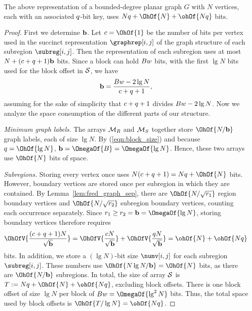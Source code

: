 {%
\begin{lemma}
  \label{lem:main_space}
  The above representation of a bounded-degree planar graph $G$ with
  $N$ vertices, each with an associated $q$-bit key, uses 
  $N \bitsPerKey + \OhOf{N} + \ohOf{N \bitsPerKey}$ bits.
\end{lemma}

\begin{proof}
  First we determine $\textbf{b}$.
  Let $c = \OhOf{1}$ be the number of bits per vertex used in the succinct
  representation $\graphrep[i,j]$ of the graph structure of each subregion
  $\subreg[i,j]$.
  Then the representation of each subregion uses at most 
  $N + (c + q + 1)\textbf{b}$ bits.
  Since a block can hold $B w$ bits, with the first $\lg N$ bits used
  for the block offset in $\mathcal{S}$, we have
  \begin{equation}
    \label{eqn:block_size}
    \textbf{b} = \frac{B w - 2 \lg N}{c + q + 1},
  \end{equation}
  assuming for the sake of simplicity that $c + q + 1$ divides 
  $B w - 2 \lg N$.
  Now we analyze the space consumption of the different parts of our structure.

  \textit{Minimum graph labels.}  The arrays $\mathcal{M}_R$ and $\mathcal{M}_S$
  together store $\OhOf{N / \succblksize}$ graph labels, each of size $\lg N$.
  By (\ref{eqn:block_size}) and because $\bitsPerKey = \OhOf{\lg N}$, 
  $\succblksize = \OmegaOf{B} = \OmegaOf{\lg N}$.
  Hence, these two arrays use $\OhOf{N}$ bits of space.

  \textit{Subregions.}  Storing every vertex once uses $N (c + \bitsPerKey + 1)
  = N \bitsPerKey + \OhOf{N}$ bits.
  However, boundary vertices are stored once per subregion in which they are 
  contained.
  By Lemma~\ref{lem:fred_graph_sep}, there are $\OhOf{N / \sqrt{\regsz}}$ region
  boundary vertices and $\OhOf{N / \sqrt{\subregsz}}$ subregion boundary
  vertices, counting each occurrence separately.
  Since $\regsz \ge \subregsz = \succblksize = \OmegaOf{\lg N}$, storing boundary
  vertices therefore requires
  \begin{equation*}
    \OhOfV{\frac{(c + \bitsPerKey + 1)N}{\sqrt{\succblksize}}} =
    \OhOfV{\frac{cN}{\sqrt{\succblksize}}} +
    \OhOfV{\frac{\bitsPerKey N}{\sqrt{\succblksize}}} = \ohOf{N} + \ohOf{N \bitsPerKey}
  \end{equation*}
  bits.
  In addition, we store a $(\lg N)$-bit size $\numv[i,j]$ for each
  subregion $\subreg[i,j]$.
  These numbers use $\OhOf{N \lg N / \succblksize} = \OhOf{N}$
  bits, as there are $\OhOf{N / \succblksize}$ subregions.
  In total, the size of array $\mathcal{S}$ is $T := N \bitsPerKey + \OhOf{N} + \ohOf{N \bitsPerKey}$,
  excluding block offsets.
  There is one block offset of size $\lg N$ per block of $B \wsize =
  \OmegaOf{\lg^2 N}$ bits.
  Thus, the total space used by block offsets is $\OhOf{T / \lg N} = \ohOf{N \bitsPerKey}$.


\end{proof}}
